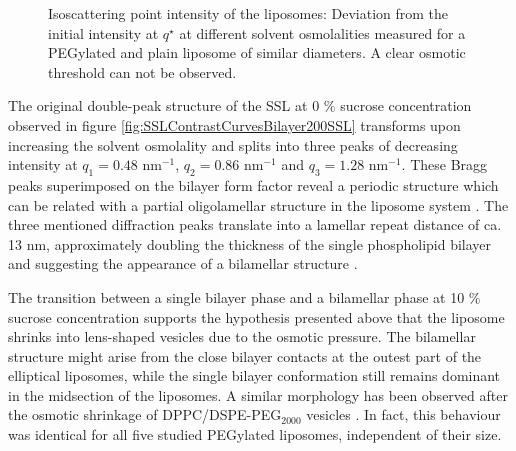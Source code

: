 \begin{figure}
	\centering
		
		\caption[Isoscattering point intensity of two different liposomes.]{Isoscattering point intensity of the liposomes: Deviation from the initial intensity at $q^{\star}$ at different solvent osmolalities measured for a PEGylated and plain liposome of similar diameters. A clear osmotic threshold can not be observed.}
		\label{fig:SSLIsopointIntensity}
\end{figure}

The original double-peak structure of the SSL at 0 $\%$ sucrose concentration observed in figure \ref{fig:SSLContrastCurvesBilayer200SSL} transforms upon increasing the solvent osmolality and splits into three peaks of decreasing intensity at $q_1=0.48$ nm$^{-1}$, $q_2=0.86$ nm$^{-1}$ and $q_3=1.28$ nm$^{-1}$. These Bragg peaks superimposed on the bilayer form factor reveal a periodic structure which can be related with a partial oligolamellar structure in the liposome system \citep{fernandez_influence_2008}. The three mentioned diffraction peaks translate into a lamellar repeat distance of ca. 13 nm, approximately doubling the thickness of the single phospholipid bilayer \citep{kenworthy_range_1995} and suggesting the appearance of a bilamellar structure \citep{deme_giant_2002}. 

The transition between a single bilayer phase and a bilamellar phase at 10 $\%$ sucrose concentration supports the hypothesis presented above that the liposome shrinks into lens-shaped vesicles due to the osmotic pressure. The bilamellar structure might arise from the close bilayer contacts at the outest part of the elliptical liposomes, while the single bilayer conformation still remains dominant in the midsection of the liposomes. A similar morphology has been observed after the osmotic shrinkage of DPPC/DSPE-PEG$_{2000}$ vesicles \citep{terreno_osmotically_2009}. In fact, this behaviour was identical for all five studied PEGylated liposomes, independent of their size. 

%		

